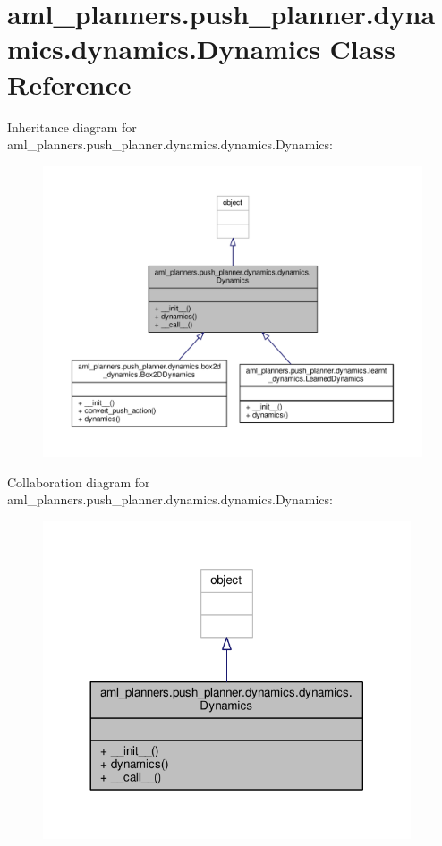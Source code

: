 \hypertarget{classaml__planners_1_1push__planner_1_1dynamics_1_1dynamics_1_1_dynamics}{\section{aml\-\_\-planners.\-push\-\_\-planner.\-dynamics.\-dynamics.\-Dynamics Class Reference}
\label{classaml__planners_1_1push__planner_1_1dynamics_1_1dynamics_1_1_dynamics}
}


Inheritance diagram for aml\-\_\-planners.\-push\-\_\-planner.\-dynamics.\-dynamics.\-Dynamics\-:\nopagebreak
\begin{figure}[H]
\begin{center}
\leavevmode
\includegraphics[width=350pt]{classaml__planners_1_1push__planner_1_1dynamics_1_1dynamics_1_1_dynamics__inherit__graph}
\end{center}
\end{figure}


Collaboration diagram for aml\-\_\-planners.\-push\-\_\-planner.\-dynamics.\-dynamics.\-Dynamics\-:\nopagebreak
\begin{figure}[H]
\begin{center}
\leavevmode
\includegraphics[width=308pt]{classaml__planners_1_1push__planner_1_1dynamics_1_1dynamics_1_1_dynamics__coll__graph}
\end{center}
\end{figure}
